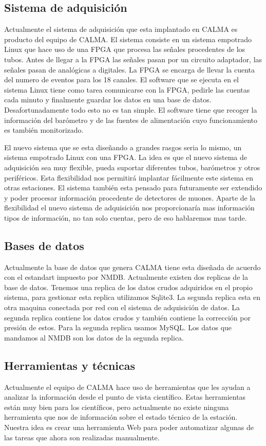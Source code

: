 	\subsection{Sistema de adquisición}
		Actualmente el sistema de adquisición que esta implantado en CALMA es producto del equipo de CALMA. El sistema consiste en un sistema empotrado
		Linux que hace uso de una FPGA que procesa las señales procedentes de los tubos. Antes de llegar a la FPGA las señales pasan por un circuito 
		adaptador, las señales pasan de analógicas a digitales. La FPGA se encarga de llevar la cuenta del numero de eventos para los 18 canales. El 
		software que se ejecuta en el sistema Linux tiene como tarea comunicarse con la FPGA, pedirle las cuentas cada minuto y finalmente guardar los
		datos en una base de datos. Desafortunadamente todo esto no es tan simple. El software tiene que recoger la información del barómetro y de las
		fuentes de alimentación cuyo funcionamiento es también monitorizado. 
		\par 
		El nuevo sistema que se esta diseñando a grandes rasgos seria lo mismo, un sistema empotrado Linux con una FPGA. La idea es que el nuevo sistema
		de adquisición sea muy flexible, pueda suportar diferentes tubos, barómetros y otros periféricos. Esta flexibilidad nos permitirá implantar 
		fácilmente este sistema en otras estaciones. El sistema también esta pensado para futuramente ser extendido y poder procesar información 
		procedente de detectores de muones. Aparte de la flexibilidad el nuevo sistema de adquisición nos proporcionaría mas información tipos de 
		información, no tan solo cuentas, pero de eso hablaremos mas tarde. 
	\subsection{Bases de datos}
		Actualmente la base de datos que genera CALMA tiene esta diseñada de acuerdo con el estandart impuesto por NMDB. Actualmente existen dos replicas
		de la base de datos. Tenemos una replica de los datos crudos adquiridos en el propio sistema, para gestionar esta replica utilizamos Sqlite3. La
		segunda replica esta en otra maquina conectada por red con el sistema de adquisición de datos. La segunda replica contiene los datos crudos y 
		también contiene la corrección por presión de estos. Para la segunda replica usamos MySQL. Los datos que mandamos al NMDB son los datos de la 
		segunda replica.
	\subsection{Herramientas y técnicas}
		Actualmente el equipo de CALMA hace uso de herramientas que les ayudan a analizar la información desde el punto de vista científico. Estas 
		herramientas están muy bien para los científicos, pero actualmente no existe ninguna herramienta que nos de información sobre el estado técnico 
		de la estación. Nuestra idea es crear una herramienta Web para poder automatizar algunas de las tareas que ahora son realizadas manualmente. 


